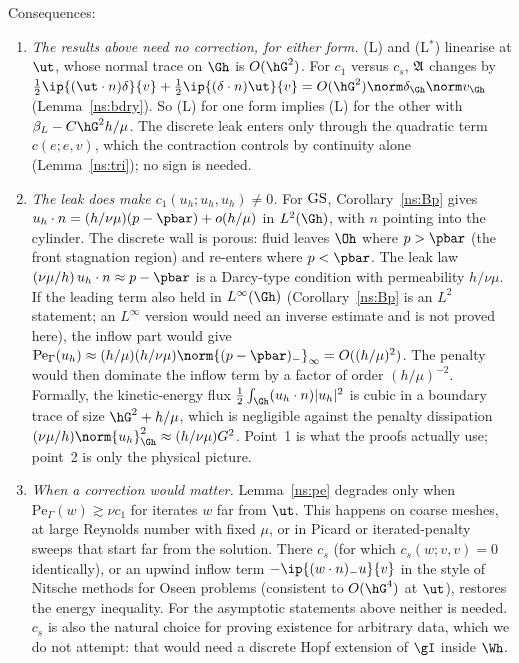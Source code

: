 Consequences:
\begin{enumerate}
\item \emph{The results above need no correction, for either form.} (L) and (L$^\ast$) linearise at $\ut$, whose normal trace on $\Gh$ is $O(\hG^2)$. For $c_1$ versus $c_s$, $\mathfrak A$ changes by $\tfrac12\ip{(\ut\cdot n)\delta}{v}+\tfrac12\ip{(\delta\cdot n)\ut}{v}=O(\hG^2)\norm\delta_{\Gh}\norm v_{\Gh}$ (Lemma~\ref{ns:bdry}). So (L) for one form implies (L) for the other with $\beta_L-C\hG^2h/\mu$. The discrete leak enters only through the quadratic term $c(e;e,v)$, which the contraction controls by continuity alone (Lemma~\ref{ns:tri}); no sign is needed.
\item \emph{The leak does make $c_1(u_h;u_h,u_h)\ne0$.} For $\mathrm{GS}$, Corollary~\ref{ns:Bp} gives $u_h\cdot n=(h/\nu\mu)(p-\pbar)+o(h/\mu)$ in $L^2(\Gh)$, with $n$ pointing into the cylinder. The discrete wall is porous: fluid leaves $\Oh$ where $p>\pbar$ (the front stagnation region) and re-enters where $p<\pbar$. The leak law $(\nu\mu/h)\,u_h\cdot n\approx p-\pbar$ is a Darcy-type condition with permeability $h/\nu\mu$. If the leading term also held in $L^\infty(\Gh)$ (Corollary~\ref{ns:Bp} is an $L^2$ statement; an $L^\infty$ version would need an inverse estimate and is not proved here), the inflow part would give $\mathrm{Pe}_\Gamma(u_h)\approx(h/\mu)(h/\nu\mu)\norm{(p-\pbar)_-}_\infty=O((h/\mu)^2)$. The penalty would then dominate the inflow term by a factor of order $(h/\mu)^{-2}$. Formally, the kinetic-energy flux $\tfrac12\int_{\Gh}(u_h\cdot n)|u_h|^2$ is cubic in a boundary trace of size $\hG^2+h/\mu$, which is negligible against the penalty dissipation $(\nu\mu/h)\norm{u_h}^2_{\Gh}\approx(h/\nu\mu)G^2$. Point~1 is what the proofs actually use; point~2 is only the physical picture.
\item \emph{When a correction would matter.} Lemma~\ref{ns:pe} degrades only when $\mathrm{Pe}_\Gamma(w)\gtrsim\nu c_1$ for iterates $w$ far from $\ut$. This happens on coarse meshes, at large Reynolds number with fixed $\mu$, or in Picard or iterated-penalty sweeps that start far from the solution. There $c_s$ (for which $c_s(w;v,v)=0$ identically), or an upwind inflow term $-\ip{(w\cdot n)_-u}{v}$ in the style of Nitsche methods for Oseen problems (consistent to $O(\hG^4)$ at $\ut$), restores the energy inequality. For the asymptotic statements above neither is needed. $c_s$ is also the natural choice for proving existence for arbitrary data, which we do not attempt: that would need a discrete Hopf extension of $\gI$ inside $\Wh$.
\end{enumerate}

